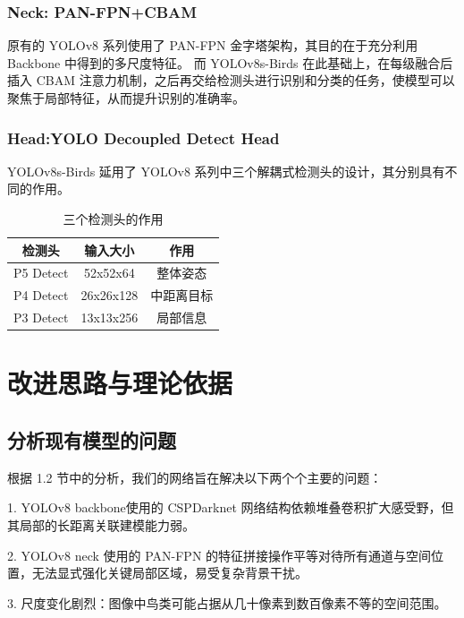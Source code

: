 \documentclass[12pt]{ctexart}
\begin{document}
\subsubsection{Neck: PAN-FPN+CBAM}
原有的 YOLOv8 系列使用了 PAN-FPN 金字塔架构，其目的在于充分利用 Backbone 中得到的多尺度特征。
而 YOLOv8s-Birds 在此基础上，在每级融合后插入 CBAM\cite{ref7} 注意力机制，之后再交给检测头进行识别和分类的任务，使模型可以聚焦于局部特征，从而提升识别的准确率。 

\subsubsection{Head:YOLO Decoupled Detect Head}
YOLOv8s-Birds 延用了 YOLOv8 系列中三个解耦式检测头的设计，其分别具有不同的作用。

\begin{table}[h!]
  \begin{center}
    \caption{三个检测头的作用}
    \begin{tabular}{|c c c|} 
      \hline
      检测头 & 输入大小 & 作用 \\
      \hline
      P5 Detect & 52x52x64 &  整体姿态\\

      P4 Detect & 26x26x128 & 中距离目标\\

      P3 Detect & 13x13x256 & 局部信息 \\
      \hline
    \end{tabular}
  \end{center}
\end{table}


\section{改进思路与理论依据}

\subsection{分析现有模型的问题}
根据 1.2 节中的分析，我们的网络旨在解决以下两个个主要的问题：

1. YOLOv8 backbone使用的 CSPDarknet 网络结构依赖堆叠卷积扩大感受野，但其局部的长距离关联建模能力弱。


2. YOLOv8 neck 使用的 PAN-FPN 的特征拼接操作平等对待所有通道与空间位置，无法显式强化关键局部区域，易受复杂背景干扰。


3. 尺度变化剧烈：图像中鸟类可能占据从几十像素到数百像素不等的空间范围。
\end{document}
